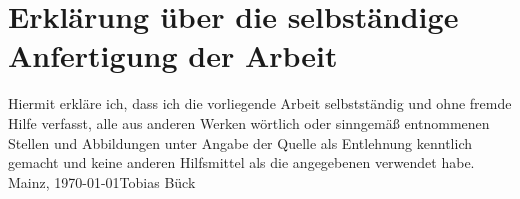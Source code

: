 \documentclass[a4paper,12pt,arial]{scrartcl}
\newcommand{\Name}{Tobias Bück}
\newcommand{\Ort}{Mainz}
\begin{document}
\printbibheading
\printbibliography[omitnumbers=false,type=online,heading=subbibliography,title={Digital}]


  
\printbibliography[nottype=online, heading=subbibliography, title=Bücher]



\section{Erklärung über die selbständige Anfertigung der Arbeit}
Hiermit erkläre ich, dass ich die vorliegende Arbeit selbstständig und ohne fremde Hilfe verfasst, alle aus anderen Werken wörtlich oder sinngemäß entnommenen Stellen und Abbildungen unter Angabe der Quelle als Entlehnung kenntlich gemacht und keine anderen Hilfsmittel als die angegebenen verwendet habe. \\
\Ort, \today \space \Name
\end{document}
